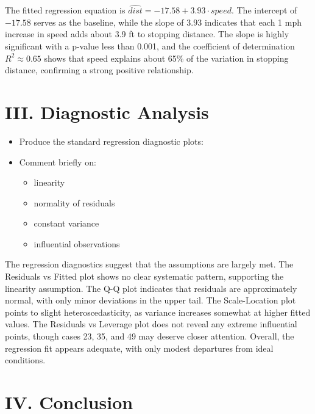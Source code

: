 \documentclass{article}
\begin{document}
\bigskip

\bigskip

The fitted regression equation is $\hat{dist} = -17.58 + 3.93 \cdot speed$. The intercept of $-17.58$ serves as the baseline, while the slope of $3.93$ indicates that each 1 mph increase in speed adds about 3.9 ft to stopping distance. The slope is highly significant with a p-value less than 0.001, and the coefficient of determination $R^2 \approx 0.65$ shows that speed explains about 65\% of the variation in stopping distance, confirming a strong positive relationship.



\newpage
\section*{III. Diagnostic Analysis}
\begin{itemize}[label=$\rightarrow$]
    \item Produce the standard regression diagnostic plots:
    \item Comment briefly on:
        \begin{itemize}
            \item linearity
            \item normality of residuals
            \item constant variance
            \item influential observations
        \end{itemize}
\end{itemize}


\bigskip

\bigskip

The regression diagnostics suggest that the assumptions are largely met. The Residuals vs Fitted plot shows no clear systematic pattern, supporting the linearity assumption. The Q-Q plot indicates that residuals are approximately normal, with only minor deviations in the upper tail. The Scale-Location plot points to slight heteroscedasticity, as variance increases somewhat at higher fitted values. The Residuals vs Leverage plot does not reveal any extreme influential points, though cases 23, 35, and 49 may deserve closer attention. Overall, the regression fit appears adequate, with only modest departures from ideal conditions.


\newpage

\section*{IV. Conclusion}
\end{document}
